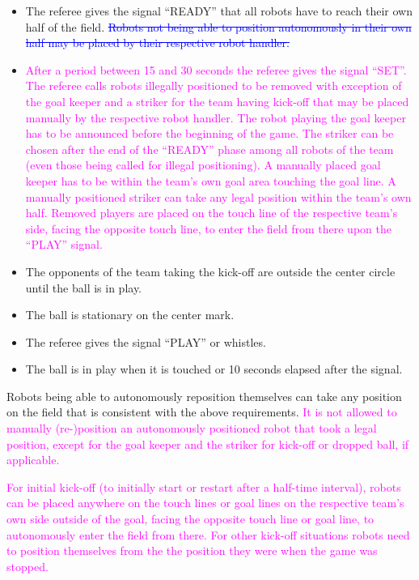 \begin{itemize}
\item The referee gives the signal ``READY'' that all robots have to reach their own half of the field. \textcolor{blue}{\sout{Robots not being able to position autonomously in their own half may be placed by their respective robot handler.}}
\item \textcolor{magenta}{After a period between 15 and 30 seconds the referee gives the signal ``SET''. The referee calls robots illegally positioned to be removed with exception of the goal keeper and a striker for the team having kick-off that may be placed manually by the respective robot handler. The robot playing the goal keeper has to be announced before the beginning of the game. The striker can be chosen after the end of the ``READY'' phase among all robots of the team (even those being called for illegal positioning). A manually placed goal keeper has to be within the team's own goal area touching the goal line. A manually positioned striker can take any legal position within the team's own half. Removed players are placed on the touch line of the respective team's side, facing the opposite touch line, to enter the field from there upon the ``PLAY'' signal. } 
\item The opponents of the team taking the kick-off are outside the center circle until the ball is in play.
\item The ball is stationary on the center mark. 
\item The referee gives the signal ``PLAY'' or whistles.
\item The ball is in play when it is touched or 10 seconds elapsed after the signal.
\end{itemize}

Robots being able to autonomously reposition themselves can take any position on the field that is consistent with the above requirements. \textcolor{magenta}{It is not allowed to manually (re-)position an autonomously positioned robot that took a legal position, except for the goal keeper and the striker for kick-off or dropped ball, if applicable.}
 
\textcolor{magenta}{For initial kick-off (to initially start or restart after a half-time interval), robots can be placed anywhere on the touch lines or goal lines on the respective team's own side outside of the goal, facing the opposite touch line or goal line, to autonomously enter the field from there. For other kick-off situations robots need to position themselves from the the position they were when the game was stopped.}

